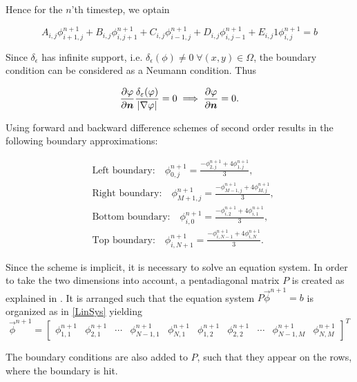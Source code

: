 Hence for the $n$'th timestep, we optain

\begin{equation}
A_{i,j}\phi_{i+1,j}^{n+1} + B_{i,j}\phi_{i,j+1}^{n+1} + C_{i,j}\phi_{i-1,j}^{n+1} + D_{i,j}\phi_{i,j-1}^{n+1} + E_{i,j}1\phi_{i,j}^{n+1} = b\label{LinSys}
\end{equation}

Since $\delta_\epsilon$ has infinite support, i.e. $\delta_\epsilon(\phi)\neq 0\;\forall (x,y)\in\Omega$, the boundary condition can be considered as a Neumann condition. Thus

\begin{equation}
\frac{\partial \varphi}{\partial \boldsymbol{n} }\frac{\delta_\varepsilon(\varphi)}{\left| {\nabla\varphi} \right|}=0 \implies \frac{\partial \varphi}{\partial \boldsymbol{n} }=0.
\end{equation}

Using forward and backward difference schemes of second order results in the following boundary approximations:

\begin{align*}
&\text{Left boundary:}\quad \phi_{0,j}^{n+1} = \frac{-\phi_{2,j}^{n+1}+4\phi_{1,j}^{n+1}}{3},\\
&\text{Right boundary:}\quad \phi_{M+1,j}^{n+1} = \frac{-\phi_{M-1,j}^{n+1}+4\phi_{M,j}^{n+1}}{3},\\
&\text{Bottom boundary:}\quad \phi_{i,0}^{n+1} = \frac{-\phi_{i,2}^{n+1}+4\phi_{i,1}^{n+1}}{3},\\
&\text{Top boundary:}\quad \phi_{i,N+1}^{n+1} = \frac{-\phi_{i,N-1}^{n+1}+4\phi_{i,N}^{n+1}}{3}.
\end{align*}

Since the scheme is implicit, it is necessary to solve an equation system. In order to take the two dimensions into account, a pentadiagonal matrix $P$ is created as explained in \cite{holm.07}. It is arranged such that the equation system $P\vec{\phi}^{n+1} = b$ is organized as in \eqref{LinSys} yielding
\begin{equation}\label{phivec}
\vec{\phi}^{n+1} = 
\begin{bmatrix}
  \phi_{1,1}^{n+1} & \phi_{2,1}^{n+1} & \cdots & \phi_{N-1,1}^{n+1} & \phi_{N,1}^{n+1} & \phi_{1,2}^{n+1} & \phi_{2,2}^{n+1} & \cdots 
  & \phi_{N-1,M}^{n+1} & \phi_{N,M}^{n+1}
\end{bmatrix}^T
\end{equation}

The boundary conditions are also added to $P$, such that they appear on the rows, where the boundary is hit.

